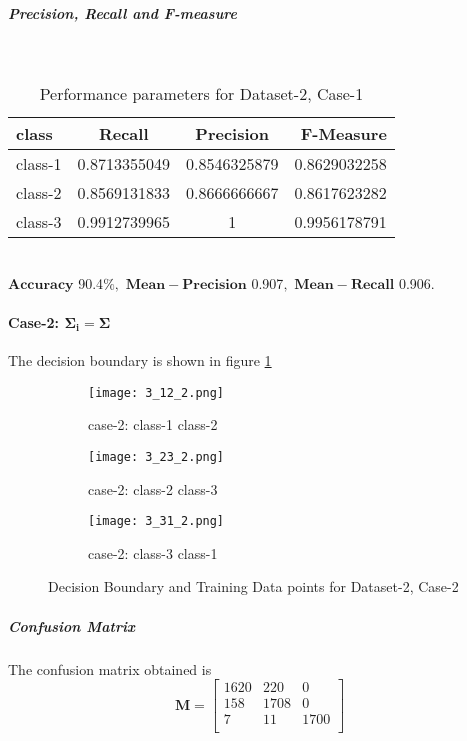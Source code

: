 \documentclass[a4paper]{article}
\begin{document}
\subparagraph{Precision, Recall and F-measure} \textcolor{white}{:}
\begin{table}[h!]
  \begin{center}
    \caption{Performance parameters for Dataset-2, Case-1}
    \label{tab:table1}
    \begin{tabular}{l|c|c|r} %
      \textbf{class} & \textbf{Recall} & \textbf{Precision} & \textbf{F-Measure}\\
      \hline
      class-1 & 0.8713355049 & 0.8546325879 & 0.8629032258\\
      class-2 & 0.8569131833 & 0.8666666667 & 0.8617623282\\
      class-3 & 0.9912739965 & 1 & 0.9956178791\\
    \end{tabular}
  \end{center}
\end{table}
\\$\mathbf{Accuracy}$ 90.4$\%,$ $\mathbf{Mean -Precision}$ 0.907$,$ $\mathbf{Mean- Recall}$ 0.906$.$
\newpage
\paragraph{Case-2: $\mathbf{\Sigma_{i}}=\mathbf{\Sigma}$}
The decision boundary is shown in figure \ref{fig:3_2}
\begin{figure}[h!]
  \centering
  \begin{subfigure}[b]{0.4\linewidth}
    \texttt{[image: 3\_12\_2.png]}
     \caption{case-2: class-1 class-2}
  \end{subfigure}
  \begin{subfigure}[b]{0.4\linewidth}
    \texttt{[image: 3\_23\_2.png]}
    \caption{case-2: class-2 class-3}
  \end{subfigure}
  \begin{subfigure}[b]{0.4\linewidth}
    \texttt{[image: 3\_31\_2.png]}
    \caption{case-2: class-3 class-1}
  \end{subfigure}
  \caption{Decision Boundary and Training Data points for Dataset-2, Case-2}
  \label{fig:3_2}
\end{figure}
\subparagraph{Confusion Matrix}
The confusion matrix obtained is
\[
\mathbf{M} = \left[ {\begin{array}{ccc}
1620 & 220 & 0\\
158 & 1708 & 0\\
7 & 11 & 1700\\
\end{array}} \right]
\]
\\
\end{document}
